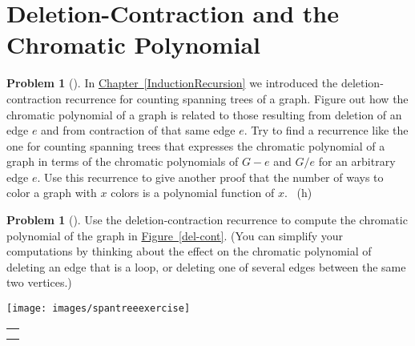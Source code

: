 \documentclass[10pt,]{book}
\theoremstyle{plain}
\theoremstyle{definition}
\newtheorem{activity}[project]{Problem}
\theoremstyle{definition}
\numberwithin{equation}{chapter}
\newlength{\panelmax}
\newcommand{\importantarrow}{\Rightarrow}
\begin{document}
\section[{Deletion-Contraction and the Chromatic Polynomial}]{Deletion-Contraction and the Chromatic Polynomial}\label{sec_inclexcl-delcont}
\begin{activity}[]\marginsymbol[-1em]{\pdftooltip{$\importantarrow$}{especially interesting}} \label{chrompolydel_cont}
\hypertarget{p-1410}{}%
In \hyperref[InductionRecursion]{Chapter~\ref{InductionRecursion}} we introduced the deletion-contraction recurrence for counting spanning trees of a graph. Figure out how the chromatic polynomial of a graph is related to those resulting from deletion of an edge \(e\) and from contraction of that same edge \(e\). Try to find a recurrence like the one for counting spanning trees that expresses the chromatic polynomial of a graph in terms of the chromatic polynomials of \(G-e\) and \(G/e\) for an arbitrary edge \(e\). Use this recurrence to give another proof that the number of ways to color a graph with \(x\) colors is a polynomial function of \(x\).%
~{\tiny (h)}\end{activity}
\begin{activity}[]\marginsymbol[-1em]{} \label{activity-244}
\hypertarget{p-1413}{}%
Use the deletion-contraction recurrence to compute the chromatic polynomial of the graph in \hyperref[del-cont]{Figure~\ref{del-cont}}. (You can simplify your computations by thinking about the effect on the chromatic polynomial of deleting an edge that is a loop, or deleting one of several edges between the same two vertices.)%
{%
\setlength{\panelmax}{0pt}
\ifdefined\panelboxAimage\else\newsavebox{\panelboxAimage}\fi%
\begin{lrbox}{\panelboxAimage}
\texttt{[image: images/spantreeexercise]}
\end{lrbox}
\ifdefined\phAimage\else\newlength{\phAimage}\fi%
\setlength{\phAimage}{\ht\panelboxAimage+\dp\panelboxAimage}
\settototalheight{\phAimage}{\usebox{\panelboxAimage}}
\setlength{\panelmax}{\maxof{\panelmax}{\phAimage}}
\leavevmode%
\setlength{\tabcolsep}{0\linewidth}
\par\medskip\noindent
\hspace*{0.375\linewidth}%
\begin{tabular}{@{}*{1}{c}@{}}
\begin{minipage}[c][\panelmax][t]{0.25\linewidth}\usebox{\panelboxAimage}\end{minipage}\tabularnewline
\parbox[t]{0.25\linewidth}{
}\end{tabular}\\
}%
\end{activity}
\end{document}

